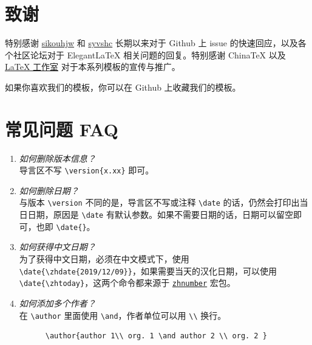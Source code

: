 \documentclass[cn,blue,12pt,normal]{elegantnote}
\begin{document}
\section{致谢}

特别感谢 \href{https://github.com/sikouhjw}{sikouhjw} 和 \href{https://github.com/syvshc}{syvshc}  长期以来对于 Github 上 issue 的快速回应，以及各个社区论坛对于 Elegant\LaTeX{} 相关问题的回复。特别感谢 China\TeX{} 以及 \href{http://www.latexstudio.net/}{\LaTeX{} 工作室} 对于本系列模板的宣传与推广。

如果你喜欢我们的模板，你可以在 Github 上收藏我们的模板。

\section{常见问题 FAQ}

\begin{enumerate}[label=\arabic*).]
  \item \textit{如何删除版本信息？}\\
    导言区不写 \lstinline|\version{x.xx}| 即可。
  \item \textit{如何删除日期？}\\
    与版本 \lstinline{\version} 不同的是，导言区不写或注释 \lstinline{\date} 的话，仍然会打印出当日日期，原因是 \lstinline{\date} 有默认参数。如果不需要日期的话，日期可以留空即可，也即 \lstinline|\date{}|。
  \item \textit{如何获得中文日期？}\\
    为了获得中文日期，必须在中文模式下，使用 \lstinline|\date{\zhdate{2019/12/09}}|，如果需要当天的汉化日期，可以使用 \lstinline|\date{\zhtoday}|，这两个命令都来源于 \href{https://ctan.org/pkg/zhnumber}{\lstinline{zhnumber}} 宏包。
  \item \textit{如何添加多个作者？}\\
    在 \lstinline{\author} 里面使用 \lstinline{\and}，作者单位可以用 \lstinline{\\} 换行。
    \begin{lstlisting}
      \author{author 1\\ org. 1 \and author 2 \\ org. 2 }
    \end{lstlisting}
\end{enumerate}

\end{document}
